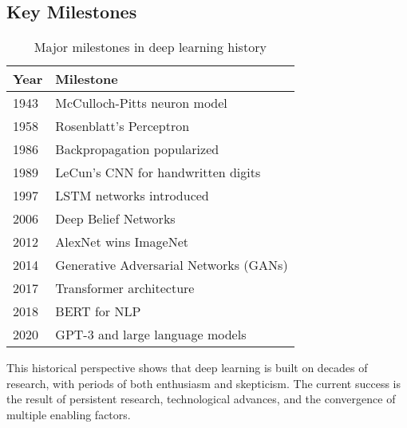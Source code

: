 \subsection{Key Milestones}

\begin{table}[h]
\centering
\caption{Major milestones in deep learning history}
\label{tab:milestones}
\small
\begin{tabular}{@{}ll@{}}
\toprule
\textbf{Year} & \textbf{Milestone} \\
\midrule
1943 & McCulloch-Pitts neuron model \\
1958 & Rosenblatt's Perceptron \\
1986 & Backpropagation popularized \\
1989 & LeCun's CNN for handwritten digits \\
1997 & LSTM networks introduced \\
2006 & Deep Belief Networks \\
2012 & AlexNet wins ImageNet \\
2014 & Generative Adversarial Networks (GANs) \\
2017 & Transformer architecture \\
2018 & BERT for NLP \\
2020 & GPT-3 and large language models \\
\bottomrule
\end{tabular}
\end{table}

This historical perspective shows that deep learning is built on decades of research, with periods of both enthusiasm and skepticism. The current success is the result of persistent research, technological advances, and the convergence of multiple enabling factors.
